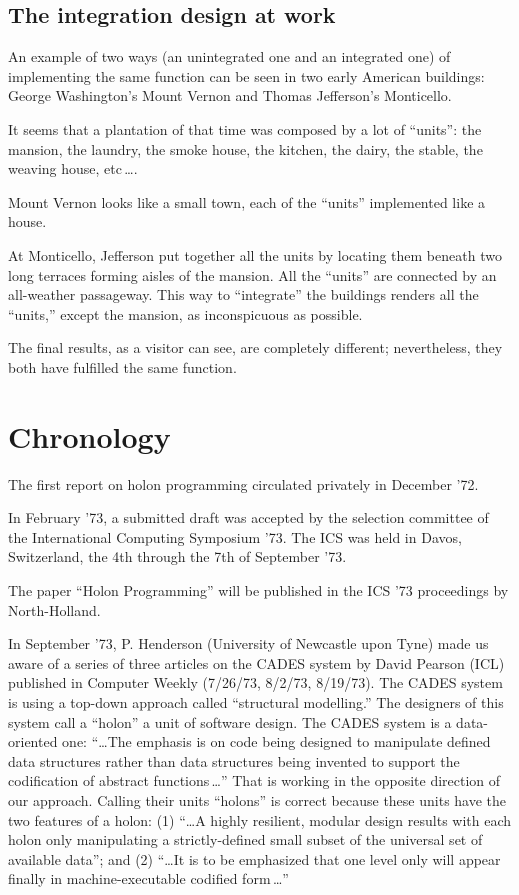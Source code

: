 \documentclass[openany,nobib]{tufte-book}
\begin{document}
\subsection{The integration design at work}

An example of two ways (an unintegrated one and an integrated one) of
implementing the same function can be seen in two early American buildings:
George Washington's Mount Vernon and Thomas Jefferson's Monticello.

It seems that a plantation of that time was composed by a lot of ``units'': the
mansion, the laundry, the smoke house, the kitchen, the dairy, the stable, the
weaving house, etc\,\dots .

Mount Vernon looks like a small town, each of the ``units'' implemented like a
house.

At Monticello, Jefferson put together all the units by locating them beneath
two long terraces forming aisles of the mansion. All the ``units'' are
connected by an all-weather passageway. This way to ``integrate'' the buildings
renders all the ``units,'' except the mansion, as inconspicuous as possible.

The final results, as a visitor can see, are completely different;
nevertheless, they both have fulfilled the same function.

\section{Chronology}

The first report on holon programming circulated privately in December
'72.\autocite{marneffe1972}

In February '73, a submitted draft was accepted by the selection committee of
the International Computing Symposium '73. The ICS was held in Davos,
Switzerland, the 4th through the 7th of September '73.

The paper ``Holon Programming'' will be published in the ICS '73 proceedings by
North-Holland.\autocite{marneffe1973}

In September '73, P. Henderson (University of Newcastle upon Tyne)  made us
aware of a series of three articles on the CADES system by David Pearson (ICL)
published in Computer Weekly (7/26/73, 8/2/73, 8/19/73). The CADES system is
using a top-down approach called ``structural modelling.'' The designers of
this system call a ``holon'' a unit of software design. The CADES system is a
data-oriented one: ``\dots The emphasis is on code being designed to manipulate
defined data structures rather than data structures being invented to support
the codification of abstract functions\,\dots'' That is working in the opposite
direction of our approach. Calling their units ``holons'' is correct because
these units have the two features of a holon: (1) ``\dots A highly resilient,
modular design results with each holon only manipulating a strictly-defined
small subset of the universal set of available data''; and (2) ``\dots It is to
be emphasized that one level only will appear finally in machine-executable
codified form\,\dots''
\end{document}
